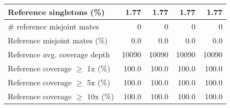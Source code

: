 \documentclass[12pt,a4paper]{article}
\begin{document}
\begin{table}[ht]
\begin{center}
\begin{tabular}{|l*{4}{|r}|}
Reference singletons (\%) & 1.77 & 1.77 & 1.77 & 1.77 \\ \hline
\# reference misjoint mates & 0 & 0 & 0 & 0 \\ \hline
Reference misjoint mates (\%) & 0.0 & 0.0 & 0.0 & 0.0 \\ \hline
Reference avg. coverage depth & 10090 & 10090 & 10090 & 10090 \\ \hline
Reference coverage $\geq$ 1x (\%) & 100.0 & 100.0 & 100.0 & 100.0 \\ \hline
Reference coverage $\geq$ 5x (\%) & 100.0 & 100.0 & 100.0 & 100.0 \\ \hline
Reference coverage $\geq$ 10x (\%) & 100.0 & 100.0 & 100.0 & 100.0 \\ \hline
\end{tabular}
\end{center}
\end{table}
\end{document}
